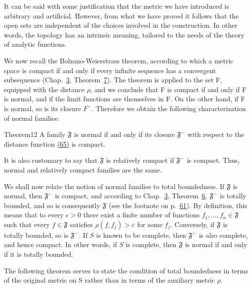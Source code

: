 It can be said with some justification that the metric we have introduced is arbitrary and artificial. However, from what we have proved it follows that the open sets are independent of the choices involved in the construction. In other words, the topology has an intrinsic meaning, tailored to the needs of the theory of analytic functions.

We now recall the Bolzano-Weierstrass theorem, according to which a metric space is compact if and only if every infinite sequence has a convergent subsequence (Chap.~\hyperref[chap:3]{3}, Theorem~\hyperref[thm:3.7]{7}). The theorem is applied to the set F, equipped with the distance $\rho$, and we conclude that F is compact if and only if F is normal, and if the limit functions are themselves in F. On the other hand, if F is normal, so is its closure $F^{-}$. Therefore we obtain the following characterization of normal families:

\begin{originalstatement}{Theorem}{12}\label{thm:5.12}
A family $\mathfrak{F}$ is normal if and only if its closure $\mathfrak{F}^{-}$ with respect to the distance function \hyperref[eq:5.65]{(65)} is compact.
\end{originalstatement}
It is also customary to say that $\mathfrak{F}$ is relatively compact if $\mathfrak{F}^{-}$ is compact. Thus, normal and relatively compact families are the same.

We shall now relate the notion of normal families to total boundedness. If $\mathfrak{F}$ is normal, then $\mathfrak{F}^{-}$ is compact, and according to Chap.~\hyperref[chap:3]{3}, Theorem~\hyperref[thm:3.6]{6}, $\mathfrak{F}^{-}$ is totally bounded, and so is consequently $\mathfrak{F}$ (see the footnote on p.~\hyperlink{orig-p61}{61}). By definition, this means that to every $\epsilon > 0$ there exist a finite number of functions $f_{1}, \ldots, f_{n} \in \mathfrak{F}$ such that every $f \in \mathfrak{F}$ satisfies $\rho(f, f_{j}) > \varepsilon$ for some $f_{j}$. Conversely, if $\mathfrak{F}$ is totally bounded, so is $\mathfrak{F}^{-}$. If $S$ is known to be complete, then $\mathfrak{F}^{-}$ is also complete, and hence compact. In other words, if $S$ is complete, then $\mathfrak{F}$ is normal if and only if it is totally bounded.

The following theorem serves to state the condition of total boundedness in terms of the original metric on S rather than in terms of the auxiliary metric $\rho$.


